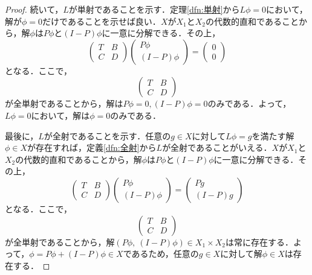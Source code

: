 \documentclass[11pt,a4paper,titlepage]{jsreport}
\theoremstyle{definition}
\begin{document}
\begin{proof}
  続いて，$L$が単射であることを示す．定理\ref{dfn:単射}から$L\phi =0$において，解が$\phi=0$だけであることを示せば良い．$X$が$X_1$と$X_2$の代数的直和であることから，解$\phi$は$P\phi$と$(I-P)\phi$に一意に分解できる．その上，
  \begin{equation*}
    \begin{pmatrix}
      T & B \\
      C & D
    \end{pmatrix}
    \begin{pmatrix}
      P\phi\\
      (I-P)\phi
    \end{pmatrix}
    =
    \begin{pmatrix}
      0 \\
      0
    \end{pmatrix}
  \end{equation*}
  となる．ここで，
  \begin{equation*}
    \begin{pmatrix}
      T & B \\
      C & D
    \end{pmatrix}
  \end{equation*}
  が全単射であることから，解は$P\phi = 0, (I-P)\phi=0$のみである．よって，$L \phi = 0$において，解は$\phi=0$のみである．

  最後に，$L$が全射であることを示す．任意の$g \in X$に対して$L \phi = g$を満たす解$\phi \in X$が存在すれば，定義\ref{dfn:全射}から$L$が全射であることがいえる．$X$が$X_1$と$X_2$の代数的直和であることから，解$\phi$は$P\phi$と$(I-P)\phi$に一意に分解できる．その上，
  \begin{equation*}
    \begin{pmatrix}
      T & B \\
      C & D
    \end{pmatrix}
    \begin{pmatrix}
      P\phi \\
      (I-P)\phi
    \end{pmatrix}
    =
    \begin{pmatrix}
      Pg \\
      (I-P)g
    \end{pmatrix}
  \end{equation*}
  となる．ここで，
  \begin{equation*}
    \begin{pmatrix}
      T & B \\
      C & D
    \end{pmatrix}
  \end{equation*}
  が全単射であることから，解$(P\phi,\ (I-P)\phi)\in X_1 \times X_2$は常に存在する．よって，$\phi = P \phi + (I-P)\phi \in X$であるため，任意の$g \in X$に対して解$\phi \in X$は存在する．
\end{proof}
\end{document}
